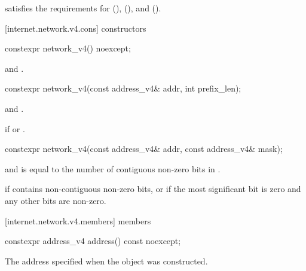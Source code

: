 \pnum
{} satisfies the requirements for  (),  (), and  ().


[internet.network.v4.cons]{ constructors}

\begin{itemdecl}
constexpr network_v4() noexcept;
\end{itemdecl}

\begin{itemdescr}
\pnum
\postconditions {} and .
\end{itemdescr}

\begin{itemdecl}
constexpr network_v4(const address_v4& addr, int prefix_len);
\end{itemdecl}

\begin{itemdescr}
\pnum
\postconditions {} and .

\pnum
\remarks {} if  or .
\end{itemdescr}

\begin{itemdecl}
constexpr network_v4(const address_v4& addr, const address_v4& mask);
\end{itemdecl}

\begin{itemdescr}
\pnum
\postconditions {} and  is equal to the number of contiguous non-zero bits in .

\pnum
\remarks {} if  contains non-contiguous non-zero bits, or if the most significant bit is zero and any other bits are non-zero.
\end{itemdescr}



[internet.network.v4.members]{ members}

\begin{itemdecl}
constexpr address_v4 address() const noexcept;
\end{itemdecl}

\begin{itemdescr}
\pnum
\returns The address specified when the  object was constructed.
\end{itemdescr}

